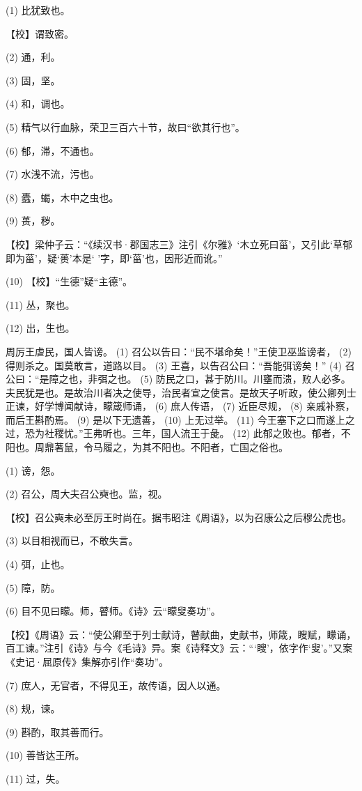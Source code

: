 \documentclass[12pt,UTF8]{ctexbook}
\begin{document}
(1) 比犹致也。

【校】谓致密。

(2) 通，利。

(3) 固，坚。

(4) 和，调也。

(5) 精气以行血脉，荣卫三百六十节，故曰“欲其行也”。

(6) 郁，滞，不通也。

(7) 水浅不流，污也。

(8) 蠹，蝎，木中之虫也。

(9) 蒉，秽。

【校】梁仲子云：“《续汉书·郡国志三》注引《尔雅》‘木立死曰菑’，又引此‘草郁即为菑’，疑‘蒉’本是‘ ’字，即‘菑’也，因形近而讹。”

(10) 【校】“生德”疑“主德”。

(11) 丛，聚也。

(12) 出，生也。

周厉王虐民，国人皆谤。 (1) 召公以告曰：“民不堪命矣！”王使卫巫监谤者， (2) 得则杀之。国莫敢言，道路以目。 (3) 王喜，以告召公曰：“吾能弭谤矣！” (4) 召公曰：“是障之也，非弭之也。 (5) 防民之口，甚于防川。川壅而溃，败人必多。夫民犹是也。是故治川者决之使导，治民者宣之使言。是故天子听政，使公卿列士正谏，好学博闻献诗，矇箴师诵， (6) 庶人传语， (7) 近臣尽规， (8) 亲戚补察，而后王斟酌焉。 (9) 是以下无遗善， (10) 上无过举。 (11) 今王塞下之口而遂上之过，恐为社稷忧。”王弗听也。三年，国人流王于彘。 (12) 此郁之败也。郁者，不阳也。周鼎著鼠，令马履之，为其不阳也。不阳者，亡国之俗也。

(1) 谤，怨。

(2) 召公，周大夫召公奭也。监，视。

【校】召公奭未必至厉王时尚在。据韦昭注《周语》，以为召康公之后穆公虎也。

(3) 以目相视而已，不敢失言。

(4) 弭，止也。

(5) 障，防。

(6) 目不见曰矇。师，瞽师。《诗》云“矇叟奏功”。

【校】《周语》云：“使公卿至于列士献诗，瞽献曲，史献书，师箴，瞍赋，矇诵，百工谏。”注引《诗》与今《毛诗》异。案《诗释文》云：“‘瞍’，依字作‘叟’。”又案《史记·屈原传》集解亦引作“奏功”。

(7) 庶人，无官者，不得见王，故传语，因人以通。

(8) 规，谏。

(9) 斟酌，取其善而行。

(10) 善皆达王所。

(11) 过，失。
\end{document}

